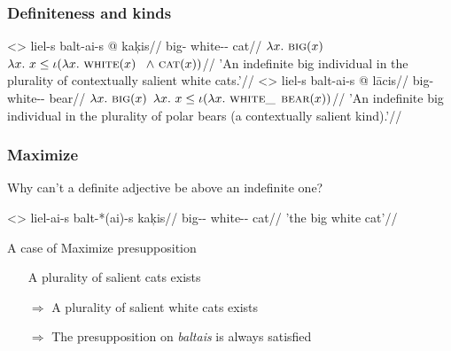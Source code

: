 \documentclass[9pt, t]{beamer}
\begin{document}
\begin{frame}
    \frametitle{Definiteness and kinds}

    \pex
        \a<>\begingl
            \gla liel-s \ljudge{[$_\text{AP}$\ }balt-ai-s @ kaķis\judge{]}//
            \glb big-\Nom{} white-\Def-\Nom{} cat//
            \glb $\lambda x.\ \textsc{big}(x)$ $\lambda x.\ x\le\iota(\lambda x.\ \textsc{white}(x)$ $\ \land\ \textsc{cat}(x))$//
            \glft 'An indefinite big individual in the plurality of contextually salient white cats.'\vspace{1em}//
        \endgl
        \a<> \begingl
            \gla liel-s \ljudge{[$_\text{NP}$\ }balt-ai-s @ lācis\judge{]}//
            \glb big-\Nom{} white-\Def-\Nom{} bear//
            \glb $\lambda x.\ \textsc{big}(x)$ $\lambda x.\ x\le\iota(\lambda x.\ \textsc{white\_}$ $\textsc{bear}(x))$//
            \glft 'An indefinite big individual in the plurality of polar bears (a contextually salient kind).'//
        \endgl
    \xe
\end{frame}

\begin{frame}
    \frametitle{Maximize}

    Why can't a definite adjective be above an indefinite one?

    \ex<>
        \begingl
            \gla liel-ai-s balt-*(ai)-s kaķis//
            \glb big-\Def-\Nom{} white-\Def-\Nom{} cat//
            \glft 'the big white cat'//
        \endgl
    \xe

    \pause
    
    A case of Maximize presupposition \citep{heim1991, copbeav2015}
    \begin{itemize}
        \item[] A plurality of salient cats exists
        \item[$\Rightarrow$] A plurality of salient white cats exists
        \item[$\Rightarrow$] The presupposition on \textit{baltais} is always satisfied
    \end{itemize}

\end{frame}
\end{document}
